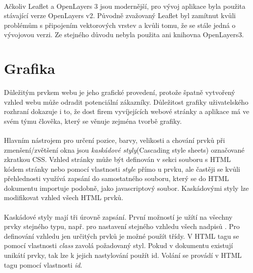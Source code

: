 \documentclass[11pt,a4paper,titlepage,oneside]{book}
\begin{document}
		\paragraph{} Ačkoliv Leaflet a OpenLayers 3 jsou modernější, pro vývoj aplikace byla použita stávající verze OpenLayers v2. Původně zvažovaný Leaflet byl zamítnut kvůli problémům s připojením vektorových vrstev a kvůli tomu, že se stále jedná o vývojovou verzi. Ze stejného důvodu nebyla použita ani knihovna OpenLayers3.
	\section{Grafika}
		\paragraph{} Důležitým prvkem webu je jeho grafické provedení, protože špatně vytvořený vzhled webu může odradit potenciální zákazníky. Důležitost grafiky uživatelského rozhraní dokazuje i to, že dost firem vyvíjejících webové stránky a aplikace má ve svém týmu člověka, který se věnuje zejména tvorbě grafiky.
		\paragraph{} Hlavním nástrojem pro určení pozice, barvy, velikosti a chování prvků při zmenšení/zvětšení okna jsou \textit{kaskádové styly}(Cascading style sheets) označované zkratkou CSS. Vzhled stránky může být definován v sekci  souboru s HTML kódem stránky nebo pomocí vlastnosti \textit{style} přímo u prvku, ale častěji se kvůli přehlednosti využívá zapsání do samostatného souboru, který se do HTML dokumentu importuje podobně, jako javascriptový soubor. Kaskádovými styly lze modifikovat vzhled všech HTML prvků. 
		\paragraph{} Kaskádové styly mají tři úrovně zapsání. První možností je užítí na všechny prvky stejného typu, např. pro nastavení stejného vzhledu všech nadpisů . Pro definování vzhledu jen určitých prvků je možné použít třídy. V HTML tagu se pomocí vlastnosti \textit{class} zavolá požadovaný styl. Pokud v dokumentu existují unikátí prvky, tak lze k jejich nastylování použít id. Volání se provádí v HTML tagu pomocí vlastnosti \textit{id}.
\end{document}
